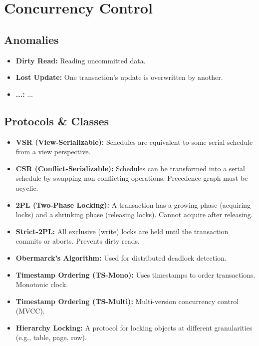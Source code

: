 
\section*{Concurrency Control}

\subsection*{Anomalies}
\begin{itemize}
    \item \textbf{Dirty Read:} Reading uncommitted data.
    \item \textbf{Lost Update:} One transaction's update is overwritten by another.
    \item \textbf{...:} ...
\end{itemize}

\subsection*{Protocols \& Classes}
\begin{itemize}
    \item \textbf{VSR (View-Serializable):} Schedules are equivalent to some serial schedule from a view perspective.
    \item \textbf{CSR (Conflict-Serializable):} Schedules can be transformed into a serial schedule by swapping non-conflicting operations. Precedence graph must be acyclic.
    \item \textbf{2PL (Two-Phase Locking):} A transaction has a growing phase (acquiring locks) and a shrinking phase (releasing locks). Cannot acquire after releasing.
    \item \textbf{Strict-2PL:} All exclusive (write) locks are held until the transaction commits or aborts. Prevents dirty reads.
    \item \textbf{Obermarck's Algorithm:} Used for distributed deadlock detection.
    \item \textbf{Timestamp Ordering (TS-Mono):} Uses timestamps to order transactions. Monotonic clock.
    \item \textbf{Timestamp Ordering (TS-Multi):} Multi-version concurrency control (MVCC).
    \item \textbf{Hierarchy Locking:} A protocol for locking objects at different granularities (e.g., table, page, row).
\end{itemize}
